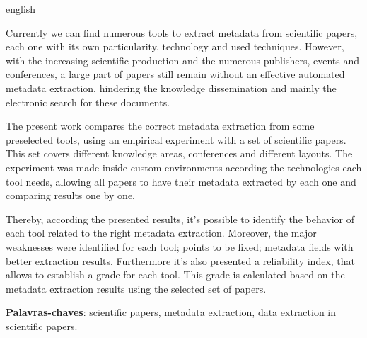 \begin{resumo}[Abstract]
\begin{otherlanguage*}{english}

Currently we can find numerous tools to extract metadata from scientific papers, each one with its own particularity, technology and used techniques. However, with the increasing scientific production and the numerous publishers, events and conferences, a large part of papers still remain without an effective automated metadata extraction, hindering the knowledge dissemination and mainly the electronic search for these documents. 

The present work compares the correct metadata extraction from some preselected tools, using an empirical experiment with a set of scientific papers. This set covers different knowledge areas, conferences and different layouts. The experiment was made inside custom environments according the technologies each tool needs, allowing all papers to have their metadata extracted by each one and comparing results one by one. 

Thereby, according the presented results, it's possible to identify the behavior of each tool related to the right metadata extraction. Moreover, the major weaknesses were identified for each tool; points to be fixed; metadata fields with better extraction results. Furthermore it's also presented a reliability index, that allows to establish a grade for each tool. This grade is calculated based on the metadata extraction results using the selected set of papers.

\textbf{Palavras-chaves}: scientific papers, metadata extraction, data extraction in scientific papers.


\end{otherlanguage*}
\end{resumo}

 

  
